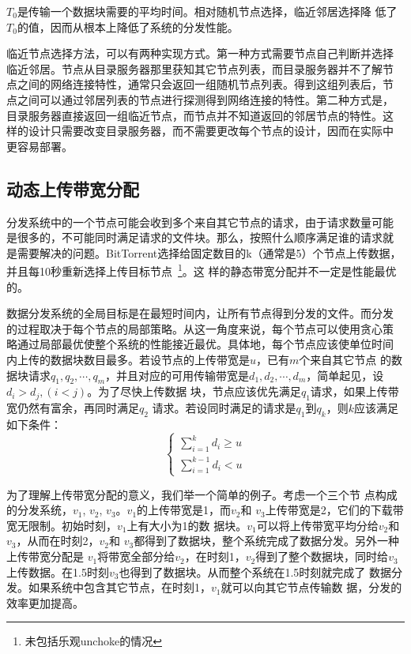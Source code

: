 $T_0$是传输一个数据块需要的平均时间。相对随机节点选择，临近邻居选择降
低了$T_0$的值，因而从根本上降低了系统的分发性能。

临近节点选择方法，可以有两种实现方式。第一种方式需要节点自己判断并选择
临近邻居。节点从目录服务器那里获知其它节点列表，而目录服务器并不了解节
点之间的网络连接特性，通常只会返回一组随机节点列表。得到这组列表后，节
点之间可以通过邻居列表的节点进行探测得到网络连接的特性。第二种方式是，
目录服务器直接返回一组临近节点，而节点并不知道返回的邻居节点的特性。这
样的设计只需要改变目录服务器，而不需要更改每个节点的设计，因而在实际中
更容易部署。

\subsection{动态上传带宽分配}


分发系统中的一个节点可能会收到多个来自其它节点的请求，由于请求数量可能
是很多的，不可能同时满足请求的文件块。那么，按照什么顺序满足谁的请求就
是需要解决的问题。BitTorrent选择给固定数目的k（通常是5）个节点上传数据，
并且每10秒重新选择上传目标节点~\footnote{未包括乐观unchoke的情况}。这
样的静态带宽分配并不一定是性能最优的。

数据分发系统的全局目标是在最短时间内，让所有节点得到分发的文件。而分发
的过程取决于每个节点的局部策略。从这一角度来说，每个节点可以使用贪心策
略通过局部最优使整个系统的性能接近最优。具体地，每个节点应该使单位时间
内上传的数据块数目最多。若设节点的上传带宽是$u$，已有$m$个来自其它节点
的数据块请求$q_1, q_2, \cdots, q_m$，并且对应的可用传输带宽是$d_1,
d_2, \cdots, d_m$，简单起见，设$d_i > d_j, (i < j)$。为了尽快上传数据
块，节点应该优先满足$q_1$请求，如果上传带宽仍然有富余，再同时满足$q_2$
请求。若设同时满足的请求是$q_1$到$q_k$，则$k$应该满足如下条件：
\begin{equation*}
\left\{
\begin{array}{l}
\sum\limits_{i=1}^k d_i \ge u \\
\sum\limits_{i=1}^{k-1} d_i < u
\end{array}\right.
\end{equation*}

为了理解上传带宽分配的意义，我们举一个简单的例子。考虑一个三个节
点构成的分发系统，$v_1$, $v_2$, $v_3$。$v_1$的上传带宽是1，而$v_2$和
$v_3$上传带宽是2，它们的下载带宽无限制。初始时刻，$v_1$上有大小为1的数
据块。$v_1$可以将上传带宽平均分给$v_2$和$v_3$，从而在时刻2，$v_2$和
$v_3$都得到了数据块，整个系统完成了数据分发。另外一种上传带宽分配是
$v_1$将带宽全部分给$v_2$，在时刻1，$v_2$得到了整个数据块，同时给$v_3$
上传数据。在1.5时刻$v_3$也得到了数据块。从而整个系统在1.5时刻就完成了
数据分发。如果系统中包含其它节点，在时刻1，$v_1$就可以向其它节点传输数
据，分发的效率更加提高。

